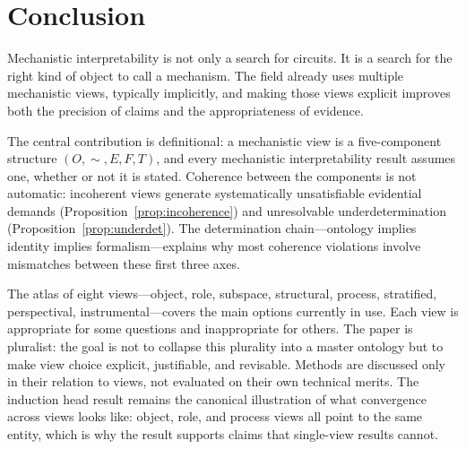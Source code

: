 \documentclass[11pt]{article}
\theoremstyle{remark}
\begin{document}
\section{Conclusion}

Mechanistic interpretability is not only a search for circuits.  It is
a search for the right kind of object to call a mechanism.  The field
already uses multiple mechanistic views, typically implicitly, and making
those views explicit improves both the precision of claims and the
appropriateness of evidence.

The central contribution is definitional: a mechanistic view is a
five-component structure $(O, {\sim}, E, F, T)$, and every
mechanistic interpretability result assumes one, whether or not it is
stated.  Coherence between the components is not automatic: incoherent
views generate systematically unsatisfiable evidential demands
(Proposition~\ref{prop:incoherence}) and unresolvable underdetermination
(Proposition~\ref{prop:underdet}).  The determination chain---ontology
implies identity implies formalism---explains why most coherence
violations involve mismatches between these first three axes.

The atlas of eight views---object, role, subspace, structural, process,
stratified, perspectival, instrumental---covers the main options
currently in use.  Each view is appropriate for some questions and
inappropriate for others.  The paper is pluralist: the goal is not to
collapse this plurality into a master ontology but to make view choice
explicit, justifiable, and revisable.  Methods are discussed only in
their relation to views, not evaluated on their own technical merits.  The induction head result remains the canonical
illustration of what convergence across views looks like: object, role,
and process views all point to the same entity, which is why the result
supports claims that single-view results cannot.
\end{document}
